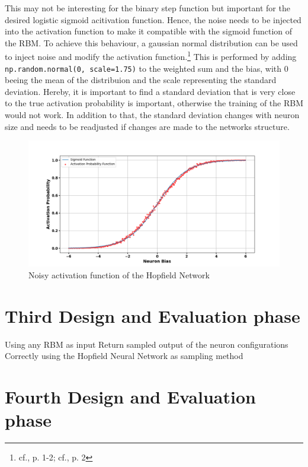 This may not be interesting for the binary step function but important for the desired logistic sigmoid acitivation function.
Hence, the noise needs to be injected into the activation function to make it compatible with the sigmoid function of the \ac{RBM}.
To achieve this behaviour, a gaussian normal distribution can be used to inject noise and modify the activation function.\footnote{cf.\cite{bohmNoiseinjectedAnalogIsing2022}, p. 1-2; cf.\cite{mahmoodiVersatileStochasticDot2019}, p. 2}
This is performed by adding \texttt{np.random.normal(0, scale=1.75)} to the weighted sum and the bias, with 0 beeing the mean of the distribuion and the scale representing the standard deviation. 
Hereby, it is important to find a standard deviation that is very close to the true activation probability is important, otherwise the training of the RBM would not work.
In addition to that, the standard deviation changes with neuron size and needs to be readjusted if changes are made to the networks structure.


\begin{figure}[H]
    \centering
    \includegraphics[width=1\linewidth]{graphics/Noisy_HNN.png}
    \caption{Noisy activation function of the Hopfield Network}
    \label{Noisy_acitivation_function}
\end{figure}

\section{Third Design and Evaluation phase}

Using any \ac{RBM} as input
Return sampled output of the neuron configurations 
Correctly using the Hopfield Neural Network as sampling method 


\section{Fourth Design and Evaluation phase}

